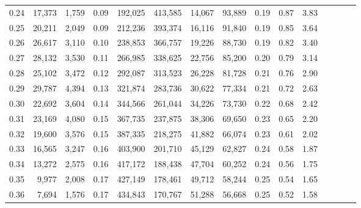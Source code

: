 \begin{tabular}{rrrcrrrrrrrrrrr}
0.24 &  17,373 &  1,759 &                                       0.09 &  192,025 &  413,585 &   14,067 &   93,889 &  0.19 &  0.87 &                         3.83 \\
0.25 &  20,211 &  2,049 &                                       0.09 &  212,236 &  393,374 &   16,116 &   91,840 &  0.19 &  0.85 &                         3.64 \\
0.26 &  26,617 &  3,110 &                                       0.10 &  238,853 &  366,757 &   19,226 &   88,730 &  0.19 &  0.82 &                         3.40 \\
0.27 &  28,132 &  3,530 &                                       0.11 &  266,985 &  338,625 &   22,756 &   85,200 &  0.20 &  0.79 &                         3.14 \\
0.28 &  25,102 &  3,472 &                                       0.12 &  292,087 &  313,523 &   26,228 &   81,728 &  0.21 &  0.76 &                         2.90 \\
0.29 &  29,787 &  4,394 &                                       0.13 &  321,874 &  283,736 &   30,622 &   77,334 &  0.21 &  0.72 &                         2.63 \\
0.30 &  22,692 &  3,604 &                                       0.14 &  344,566 &  261,044 &   34,226 &   73,730 &  0.22 &  0.68 &                         2.42 \\
0.31 &  23,169 &  4,080 &                                       0.15 &  367,735 &  237,875 &   38,306 &   69,650 &  0.23 &  0.65 &                         2.20 \\
0.32 &  19,600 &  3,576 &                                       0.15 &  387,335 &  218,275 &   41,882 &   66,074 &  0.23 &  0.61 &                         2.02 \\
0.33 &  16,565 &  3,247 &                                       0.16 &  403,900 &  201,710 &   45,129 &   62,827 &  0.24 &  0.58 &                         1.87 \\
0.34 &  13,272 &  2,575 &                                       0.16 &  417,172 &  188,438 &   47,704 &   60,252 &  0.24 &  0.56 &                         1.75 \\
0.35 &   9,977 &  2,008 &                                       0.17 &  427,149 &  178,461 &   49,712 &   58,244 &  0.25 &  0.54 &                         1.65 \\
0.36 &   7,694 &  1,576 &                                       0.17 &  434,843 &  170,767 &   51,288 &   56,668 &  0.25 &  0.52 &                         1.58 \\

\end{tabular}
